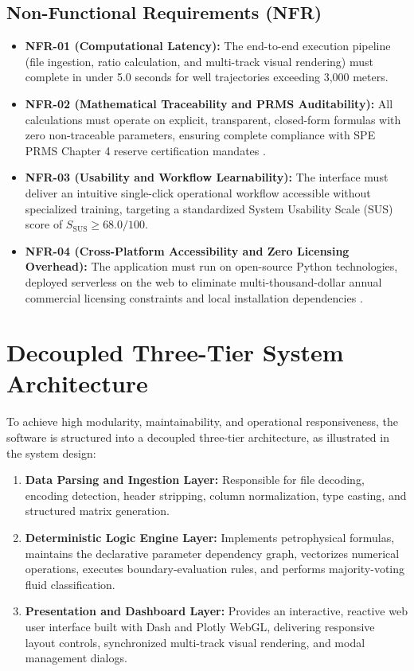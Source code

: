 \subsection{Non-Functional Requirements (NFR)}
\begin{itemize}
    \item \textbf{NFR-01 (Computational Latency):} The end-to-end execution pipeline (file ingestion, ratio calculation, and multi-track visual rendering) must complete in under 5.0 seconds for well trajectories exceeding 3,000 meters.
    \item \textbf{NFR-02 (Mathematical Traceability and PRMS Auditability):} All calculations must operate on explicit, transparent, closed-form formulas with zero non-traceable parameters, ensuring complete compliance with SPE PRMS Chapter 4 reserve certification mandates \citep{ref3}.
    \item \textbf{NFR-03 (Usability and Workflow Learnability):} The interface must deliver an intuitive single-click operational workflow accessible without specialized training, targeting a standardized System Usability Scale (SUS) score of $S_{\text{SUS}} \ge 68.0/100$.
    \item \textbf{NFR-04 (Cross-Platform Accessibility and Zero Licensing Overhead):} The application must run on open-source Python technologies, deployed serverless on the web to eliminate multi-thousand-dollar annual commercial licensing constraints and local installation dependencies \citep{wood2020}.
\end{itemize}

\section{Decoupled Three-Tier System Architecture}

To achieve high modularity, maintainability, and operational responsiveness, the software is structured into a decoupled three-tier architecture, as illustrated in the system design:
\begin{enumerate}
    \item \textbf{Data Parsing and Ingestion Layer:} Responsible for file decoding, encoding detection, header stripping, column normalization, type casting, and structured matrix generation.
    \item \textbf{Deterministic Logic Engine Layer:} Implements petrophysical formulas, maintains the declarative parameter dependency graph, vectorizes numerical operations, executes boundary-evaluation rules, and performs majority-voting fluid classification.
    \item \textbf{Presentation and Dashboard Layer:} Provides an interactive, reactive web user interface built with Dash and Plotly WebGL, delivering responsive layout controls, synchronized multi-track visual rendering, and modal management dialogs.
\end{enumerate}

